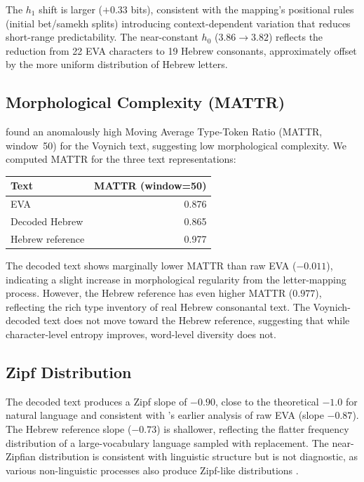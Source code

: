 \documentclass[11pt,a4paper]{article}
\begin{document}
The $h_1$ shift is larger ($+0.33$ bits), consistent with the mapping's
positional rules (initial bet/samekh splits) introducing context-dependent
variation that reduces short-range predictability. The near-constant $h_0$
($3.86 \to 3.82$) reflects the reduction from 22 EVA characters to 19
Hebrew consonants, approximately offset by the more uniform distribution
of Hebrew letters.

\subsection{Morphological Complexity (MATTR)}
\label{sec:mattr}

\citet{Lindemann2022} found an anomalously high Moving Average
Type-Token Ratio (MATTR, window~50) for the Voynich text, suggesting low
morphological complexity. We computed MATTR for the three text
representations:

\begin{center}
\begin{tabular}{@{}lr@{}}
\toprule
Text & MATTR (window=50) \\
\midrule
EVA & 0.876 \\
Decoded Hebrew & 0.865 \\
Hebrew reference & 0.977 \\
\bottomrule
\end{tabular}
\end{center}

The decoded text shows marginally lower MATTR than raw EVA ($-0.011$),
indicating a slight increase in morphological regularity from the
letter-mapping process. However, the Hebrew reference has even higher
MATTR ($0.977$), reflecting the rich type inventory of real Hebrew
consonantal text. The Voynich-decoded text does not move toward the Hebrew
reference, suggesting that while character-level entropy improves, word-level
diversity does not.

\subsection{Zipf Distribution}
\label{sec:zipfmeta}

The decoded text produces a Zipf slope of $-0.90$, close to the
theoretical $-1.0$ for natural language and consistent with
\citet{Landini2001}'s earlier analysis of raw EVA (slope $-0.87$). The
Hebrew reference slope ($-0.73$) is shallower, reflecting the flatter
frequency distribution of a large-vocabulary language sampled with
replacement. The near-Zipfian distribution is consistent with linguistic
structure but is not diagnostic, as various non-linguistic processes also
produce Zipf-like distributions \citep{Timm2014}.
\end{document}
